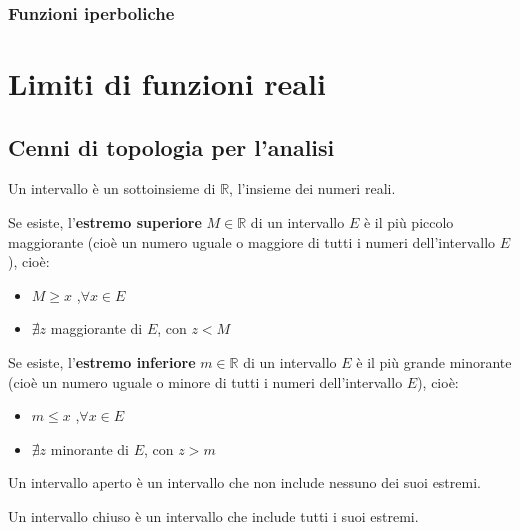 \subsection{Funzioni iperboliche}

\chapter{Limiti di funzioni reali}

\section{Cenni di topologia per l'analisi}
\begin{definition}[Intervallo] Un intervallo è un sottoinsieme di $\mathbb{R}$, l'insieme dei numeri reali.
\end{definition}
\begin{definition} Se esiste, l'\textbf{estremo superiore} $M \in \mathbb{R}$ di un intervallo $E$ è il più piccolo maggiorante (cioè un numero uguale o maggiore di tutti i numeri dell'intervallo $E$), cioè:
    \begin{itemize}
        \item $M \ge x$ ,$\forall x \in E$
        \item $\nexists z$ maggiorante di $E$, con $z < M$
    \end{itemize}
    Se esiste, l'\textbf{estremo inferiore} $m \in \mathbb{R}$ di un intervallo $E$ è il più grande minorante (cioè un numero uguale o minore di tutti i numeri dell'intervallo $E$), cioè:
    \begin{itemize}
        \item $m \le x$ ,$\forall x \in E$
        \item $\nexists z$ minorante di $E$, con $z > m$
    \end{itemize}
\end{definition}
\begin{definition} Un intervallo aperto è un intervallo che non include nessuno dei suoi estremi.
\end{definition}
\begin{definition} Un intervallo chiuso è un intervallo che include tutti i suoi estremi.
\end{definition}
